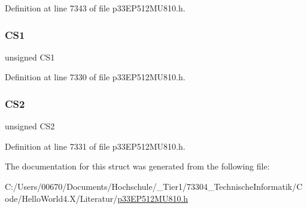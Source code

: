 Definition at line 7343 of file p33\+E\+P512\+M\+U810.\+h.

\mbox{\label{structtag_p_m_d_o_u_t1_b_i_t_s_aa09f7cd5c3d252070a01179a98c378b8}} 
\subsubsection{\texorpdfstring{C\+S1}{CS1}}
{\footnotesize\ttfamily unsigned C\+S1}



Definition at line 7330 of file p33\+E\+P512\+M\+U810.\+h.

\mbox{\label{structtag_p_m_d_o_u_t1_b_i_t_s_a82995279277458a239760ec933372aa3}} 
\subsubsection{\texorpdfstring{C\+S2}{CS2}}
{\footnotesize\ttfamily unsigned C\+S2}



Definition at line 7331 of file p33\+E\+P512\+M\+U810.\+h.



The documentation for this struct was generated from the following file\+:\begin{DoxyCompactItemize}
\item 
C\+:/\+Users/00670/\+Documents/\+Hochschule/\+\_\+\+Tier1/73304\+\_\+\+Technische\+Informatik/\+Code/\+Hello\+World4.\+X/\+Literatur/\hyperlink{p33_e_p512_m_u810_8h}{p33\+E\+P512\+M\+U810.\+h}\end{DoxyCompactItemize}
